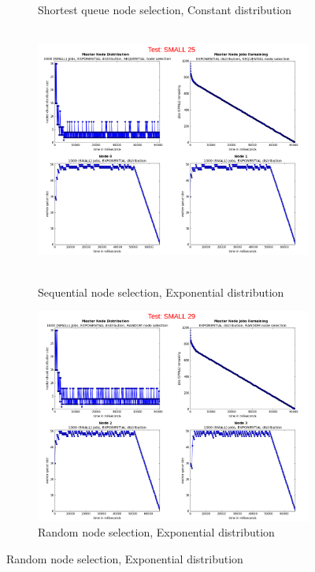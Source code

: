 \documentclass{article}
\begin{document}
\begin{figure}[p]
\begin{subfigure}[b]{0.5\linewidth}
    \caption{Shortest queue node selection, Constant distribution} 
    \label{testSmall21} 
    \vspace{4ex}
  \end{subfigure} 
  
  
  \begin{subfigure}[b]{0.5\linewidth}
    \centering
    \hbox{\hspace{-5.0em} \includegraphics[width=1.2\linewidth]{combined_small_overview/case_small_25} }
    \caption{Sequential node selection, Exponential distribution} 
    \label{testSmall25} 
    \vspace{4ex}
  \end{subfigure}%
  \begin{subfigure}[b]{0.5\linewidth}
    \centering
    \includegraphics[width=1.2\linewidth]{combined_small_overview/case_small_29} 
    \caption{Random node selection, Exponential distribution} 
    \label{testSmall29} 
    \vspace{4ex}
  \end{subfigure} 
  

\end{figure}
\end{document}
